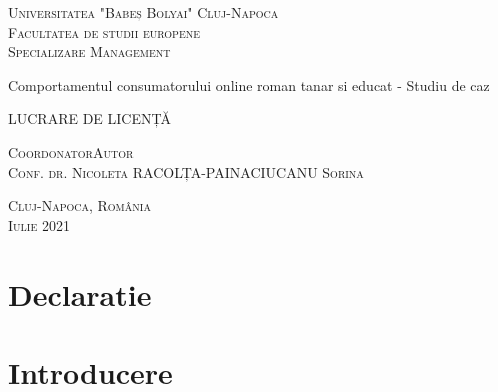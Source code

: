 \documentclass[a4paper, 12pt]{article}
\begin{document}
\begin{titlepage}
	\begin{center}
		\vspace{0.5cm}
		\LARGE \textsc{Universitatea "Babeș Bolyai"}
		\LARGE \textsc{Cluj-Napoca}
		\\
		\vspace{0.5cm}
		\Large \textsc{Facultatea de studii europene}
		\\
		\Large \textsc{Specializare Management}
		
		
		\vspace{1.5cm}
		
		\Huge Comportamentul consumatorului online roman tanar si educat - Studiu de caz
		\\
		\bigskip
	

		\vspace{0.5cm}		
		\Large LUCRARE DE LICENȚĂ
		
		\vfill
		
		\Large
		\textsc{Coordonator}\hfill \textsc{Autor}
		\\
		\large
		\textsc{Conf. dr. Nicoleta RACOLȚA-PAINA}\hfill\textsc{CIUCANU Sorina}
		
		\vspace{1.5cm}
		\textsc{Cluj-Napoca, România}\\
		\textsc{Iulie 2021}
		
	\end{center}
\end{titlepage}
\restoregeometry

\tableofcontents

\newpage
\listoffigures
\newpage
\listoftables

\newpage
\nocite{bobalcua2015loyal}
\nocite{london_economics_2011}
\nocite{duralia2016particularities}
\nocite{devderea2018consumer}
\nocite{armstrong2014principles}
\nocite{orzan2014study}
\nocite{obradattitudes}
\nocite{sava_2020}
\nocite{bighiu2015compulsive}
\nocite{gorunescu_2020}

\section*{Declaratie}
\newpage

\section*{Introducere}
	
\end{document}
